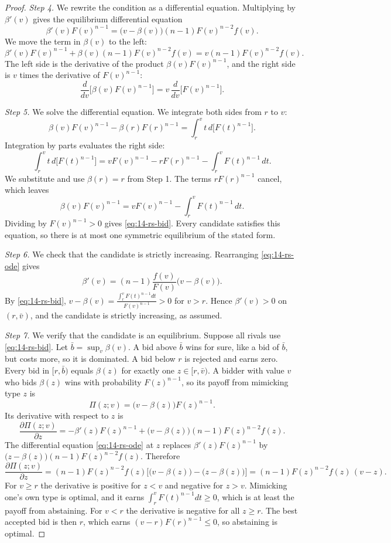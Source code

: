 \begin{proof}
\emph{Step 4.} We rewrite the condition as a differential equation. Multiplying by $\beta'(v)$ gives the equilibrium differential equation
\begin{equation}\label{eq:14-rs-ode}
\beta'(v)F(v)^{n-1}=\big(v-\beta(v)\big)(n-1)F(v)^{n-2}f(v).
\end{equation}
We move the term in $\beta(v)$ to the left:
\[
\beta'(v)F(v)^{n-1}+\beta(v)(n-1)F(v)^{n-2}f(v)=v(n-1)F(v)^{n-2}f(v).
\]
The left side is the derivative of the product $\beta(v)F(v)^{n-1}$, and the right side is $v$ times the derivative of $F(v)^{n-1}$:
\[
\frac{d}{dv}\Big[\beta(v)F(v)^{n-1}\Big]=v\,\frac{d}{dv}\Big[F(v)^{n-1}\Big].
\]

\emph{Step 5.} We solve the differential equation. We integrate both sides from $r$ to $v$:
\[
\beta(v)F(v)^{n-1}-\beta(r)F(r)^{n-1}=\int_r^v t\,d\big[F(t)^{n-1}\big].
\]
Integration by parts evaluates the right side:
\[
\int_r^v t\,d\big[F(t)^{n-1}\big]=vF(v)^{n-1}-rF(r)^{n-1}-\int_r^v F(t)^{n-1}\,dt.
\]
We substitute and use $\beta(r)=r$ from Step 1. The terms $rF(r)^{n-1}$ cancel, which leaves
\[
\beta(v)F(v)^{n-1}=vF(v)^{n-1}-\int_r^v F(t)^{n-1}\,dt.
\]
Dividing by $F(v)^{n-1}>0$ gives \eqref{eq:14-rs-bid}. Every candidate satisfies this equation, so there is at most one symmetric equilibrium of the stated form.

\emph{Step 6.} We check that the candidate is strictly increasing. Rearranging \eqref{eq:14-rs-ode} gives
\[
\beta'(v)=(n-1)\frac{f(v)}{F(v)}\big(v-\beta(v)\big).
\]
By \eqref{eq:14-rs-bid}, $v-\beta(v)=\frac{\int_r^vF(t)^{n-1}dt}{F(v)^{n-1}}>0$ for $v>r$. Hence $\beta'(v)>0$ on $(r,\bar v)$, and the candidate is strictly increasing, as assumed.

\emph{Step 7.} We verify that the candidate is an equilibrium. Suppose all rivals use \eqref{eq:14-rs-bid}. Let $\bar b=\sup_v\beta(v)$. A bid above $\bar b$ wins for sure, like a bid of $\bar b$, but costs more, so it is dominated. A bid below $r$ is rejected and earns zero. Every bid in $[r,\bar b)$ equals $\beta(z)$ for exactly one $z\in[r,\bar v)$. A bidder with value $v$ who bids $\beta(z)$ wins with probability $F(z)^{n-1}$, so its payoff from mimicking type $z$ is
\[
\Pi(z;v)=\big(v-\beta(z)\big)F(z)^{n-1}.
\]
Its derivative with respect to $z$ is
\[
\frac{\partial\Pi(z;v)}{\partial z}=-\beta'(z)F(z)^{n-1}+\big(v-\beta(z)\big)(n-1)F(z)^{n-2}f(z).
\]
The differential equation \eqref{eq:14-rs-ode} at $z$ replaces $\beta'(z)F(z)^{n-1}$ by $\big(z-\beta(z)\big)(n-1)F(z)^{n-2}f(z)$. Therefore
\[
\frac{\partial\Pi(z;v)}{\partial z}=(n-1)F(z)^{n-2}f(z)\Big[\big(v-\beta(z)\big)-\big(z-\beta(z)\big)\Big]=(n-1)F(z)^{n-2}f(z)\,(v-z).
\]
For $v\ge r$ the derivative is positive for $z<v$ and negative for $z>v$. Mimicking one's own type is optimal, and it earns $\int_r^vF(t)^{n-1}dt\ge 0$, which is at least the payoff from abstaining. For $v<r$ the derivative is negative for all $z\ge r$. The best accepted bid is then $r$, which earns $(v-r)F(r)^{n-1}\le 0$, so abstaining is optimal.


\end{proof}
